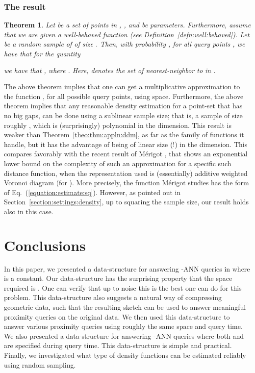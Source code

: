 \documentclass[12pt]{article}
\makeatletter
\newtheorem{theorem}{Theorem}[section] \newtheorem{lemma}[theorem]{Lemma}
\newcommand{\Term}[1]{\textsf{#1}}
\newcommand{\TermI}[1]{\Term{#1}\index{#1@\Term{#1}}}
\theoremstyle{remark}{\theorembodyfont{\rm} \newtheorem{remark}[theorem]{Remark}}
\newcommand{\thmref}[1]{Theorem~\ref{theo:#1}}
\newcommand{\Eqrefpage}[1]{Eq.~(\ref{equation:#1})}
\newcommand{\seclab}[1]{{\label{section:#1}}}
\newcommand{\secref}[1]{Section~\ref{section:#1}}
\newcommand{\defrefpage}[1]{Definition~\ref{defn:#1}}
\newcommand{\ANN}{\TermI{ANN}\xspace}
\providecommand{\Merigot}{M{\' e}rigot}
\makeatother
\begin{document}
\subsubsection{The result}

\begin{theorem}
    Let  be a set of  points in , ,  and  be parameters. Furthermore, assume that we
    are given a well-behaved function  (see
    \defrefpage{well:behaved}). Let  be a random sample of
     of size . Then, with probability , for all query points , we have
    that for the quantity
    
    we have that ,
    where .  Here, 
    denotes the set of  nearest-neighbor to  in
    .
\end{theorem}

The above theorem implies that one can get a 
multiplicative approximation to the function , for all
possible query points, using  space. Furthermore, the above
theorem implies that any reasonable density estimation for a point-set
that has no big gaps, can be done using a sublinear sample size; that
is, a sample of size roughly , which is (surprisingly)
polynomial in the dimension. This result is weaker than
\thmref{thm:appln:ddm}, as far as the family of functions it handle,
but it has the advantage of being of linear size (!) in the dimension.
This compares favorably with the recent result of \Merigot{}
\cite{m-lbfkd-13}, that shows an exponential lower bound
 on the complexity of such an
approximation for a specific such distance function, when the
representation used is (essentially) additive weighted Voronoi diagram
(for ). More precisely, the function \Merigot{} studies has the
form of \Eqrefpage{estimate:sq}. However, as pointed out in
\secref{settings:density}, up to squaring the sample size, our result
holds also in this case.



\section{Conclusions}
\seclab{conclusions}

In this paper, we presented a data-structure for answering
-\ANN queries in  where  is a constant. Our
data-structure has the surprising property that the space required is
. One can verify that up to noise this is the best one
can do for this problem. This data-structure also suggests a natural
way of compressing geometric data, such that the resulting sketch can
be used to answer meaningful proximity queries on the original
data. We then used this data-structure to answer various proximity
queries using roughly the same space and query time.  We also
presented a data-structure for answering -\ANN queries
where both  and  are specified during query time. This
data-structure is simple and practical. Finally, we investigated what
type of density functions can be estimated reliably using random
sampling.
\end{document}
